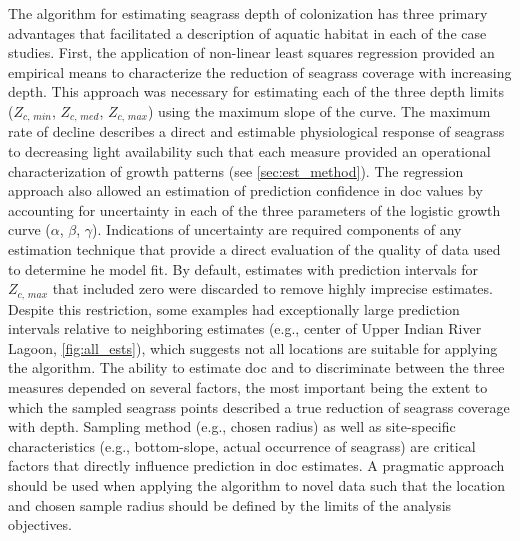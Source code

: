 \documentclass[letterpaper,12pt,oneside]{article}\usepackage[]{graphicx}\usepackage[]{color}
\begin{document}
The algorithm for estimating seagrass depth of colonization has three primary advantages that facilitated a description of aquatic habitat in each of the case studies.  First, the application of non-linear least squares regression provided an empirical means to characterize the reduction of seagrass coverage with increasing depth.  This approach was necessary for estimating each of the three depth limits ($Z_{c,\,min}$, $Z_{c,\,med}$, $Z_{c,\,max}$) using the maximum slope of the curve.  The maximum rate of decline describes a direct and estimable physiological response of seagrass to decreasing light availability such that each measure provided an operational characterization of growth patterns (see \cref{sec:est_method}).  The regression approach also allowed an estimation of prediction confidence in \ac{doc} values by accounting for uncertainty in each of the three parameters of the logistic growth curve ($\alpha$, $\beta$, $\gamma$). Indications of uncertainty are required components of any estimation technique that provide a direct evaluation of the quality of data used to determine he model fit.  By default, estimates with prediction intervals for $Z_{c,\,max}$ that included zero were discarded to remove highly imprecise estimates.  Despite this restriction, some examples had exceptionally large prediction intervals relative to neighboring estimates (e.g., center of Upper Indian River Lagoon, \cref{fig:all_ests}), which suggests not all locations are suitable for applying the algorithm. The ability to estimate \ac{doc} and to discriminate between the three measures depended on several factors, the most important being the extent to which the sampled seagrass points described a true reduction of seagrass coverage with depth.  Sampling method (e.g., chosen radius) as well as site-specific characteristics (e.g., bottom-slope, actual occurrence of seagrass) are critical factors that directly influence prediction in \ac{doc} estimates.  A pragmatic approach should be used when applying the algorithm to novel data such that the location and chosen sample radius should be defined by the limits of the analysis objectives. 
\end{document}
